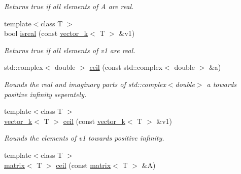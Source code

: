 \begin{DoxyCompactItemize}
\begin{DoxyCompactList}\small\item\em Returns true if all elements of A are real. \end{DoxyCompactList}\item 
\hypertarget{namespacekeycpp_ae5db41667f15caabbbdf37362e2f1990}{{\footnotesize template$<$class T $>$ }\\bool \hyperlink{namespacekeycpp_ae5db41667f15caabbbdf37362e2f1990}{isreal} (const \hyperlink{classkeycpp_1_1vector__k}{vector\-\_\-k}$<$ T $>$ \&v1)}\label{namespacekeycpp_ae5db41667f15caabbbdf37362e2f1990}

\begin{DoxyCompactList}\small\item\em Returns true if all elements of v1 are real. \end{DoxyCompactList}\item 
\hypertarget{namespacekeycpp_a005c1190f7087fb1d2545c38c080fd1a}{std\-::complex$<$ double $>$ \hyperlink{namespacekeycpp_a005c1190f7087fb1d2545c38c080fd1a}{ceil} (const std\-::complex$<$ double $>$ \&a)}\label{namespacekeycpp_a005c1190f7087fb1d2545c38c080fd1a}

\begin{DoxyCompactList}\small\item\em Rounds the real and imaginary parts of std\-::complex$<$double$>$ a towards positive infinity seperately. \end{DoxyCompactList}\item 
\hypertarget{namespacekeycpp_abc86c63af2d6788c45ac99a1f3b14ad8}{{\footnotesize template$<$class T $>$ }\\\hyperlink{classkeycpp_1_1vector__k}{vector\-\_\-k}$<$ T $>$ \hyperlink{namespacekeycpp_abc86c63af2d6788c45ac99a1f3b14ad8}{ceil} (const \hyperlink{classkeycpp_1_1vector__k}{vector\-\_\-k}$<$ T $>$ \&v1)}\label{namespacekeycpp_abc86c63af2d6788c45ac99a1f3b14ad8}

\begin{DoxyCompactList}\small\item\em Rounds the elements of v1 towards positive infinity. \end{DoxyCompactList}\item 
\hypertarget{namespacekeycpp_a4bba31744fef3693901a075fda07857c}{{\footnotesize template$<$class T $>$ }\\\hyperlink{classkeycpp_1_1matrix}{matrix}$<$ T $>$ \hyperlink{namespacekeycpp_a4bba31744fef3693901a075fda07857c}{ceil} (const \hyperlink{classkeycpp_1_1matrix}{matrix}$<$ T $>$ \&A)}\label{namespacekeycpp_a4bba31744fef3693901a075fda07857c}


\end{DoxyCompactItemize}

